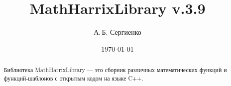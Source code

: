 \documentclass[a4paper,12pt]{article}
\title{MathHarrixLibrary v.3.9}
\author{А.\,Б. Сергиенко}
\date{\today}
\begin{document}


\maketitle

\begin{abstract}
Библиотека MathHarrixLibrary --- это сборник различных математических функций и функций-шаблонов с открытым кодом на языке C++.
\end{abstract}

\tableofcontents
\end{document}
